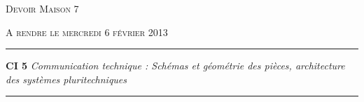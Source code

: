 \documentclass[11pt,oneside]{article}
\begin{document}
\pagestyle{fancy}
\renewcommand{\headrulewidth}{0pt}

\fancyhead{}

\fancyhead[C]{\rule{11cm}{.5pt}}


\renewcommand{\footrulewidth}{0.2pt}

\fancyfoot[C]{\footnotesize{\bfseries \thepage}}
\ifthenelse{\boolean{prof}}{%
\fancyfoot[R]{\footnotesize{DM 7}}
}{%
\fancyfoot[R]{\footnotesize{DM 6}}%
}



\begin{center}
 \Large\textsc{Devoir Maison 7}
\end{center}

\begin{center}
 \large\textsc{A rendre le mercredi 6 février 2013} 
\end{center}


\vspace{0.5cm}


\noindent\rule{\linewidth}{.2pt}
\begin{center}

 \large\textbf{CI 5} \textit{Communication technique : Schémas et géométrie des pièces, architecture des systèmes pluritechniques}
\end{center}
\noindent\rule{\linewidth}{.2pt}
\end{document}
